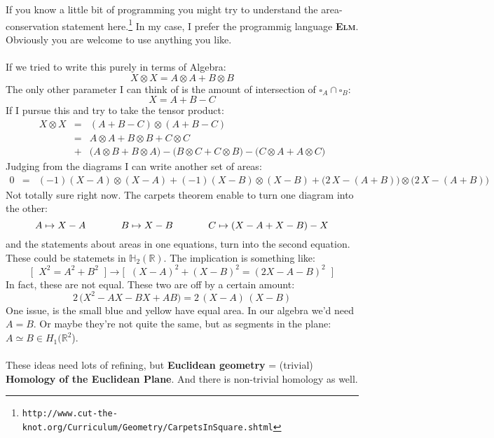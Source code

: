\documentclass[12pt]{article}
\begin{document}
If you know a little bit of programming you might try to understand the area-conservation statement here.\footnote{\texttt{http://www.cut-the-knot.org/Curriculum/Geometry/CarpetsInSquare.shtml}} In my case, I prefer the programmig language \textsc{\textbf{Elm}}.  Obviously you are welcome to use anything you like. \\ \\
If we tried to write this purely in terms of Algebra:
$$ X \otimes X = A \otimes A + B \otimes B  $$
The only other parameter I can think of is the amount of intersection of $\square_A \cap \square_B$:
$$  X = A + B - C $$
If I pursue this and try to take the tensor product:
\begin{eqnarray*} X \otimes X &=& (A + B - C) \otimes (A + B - C) \\  
&=& A \otimes A + B \otimes B + C \otimes C \\
&+& \big( A \otimes B + B \otimes A\big)
- \big( B \otimes C + C \otimes B\big)
- \big( C \otimes A + A \otimes C\big) \end{eqnarray*}
Judging from the diagrams I can write another set of areas:
\begin{eqnarray*}
0 &=& (-1)(X-A) \otimes (X-A) + (-1)(X-B) \otimes (X-B) +
\Big( 2\,X - (A+B) \Big)\otimes \Big(2\,X - (A+B)\Big) \end{eqnarray*}
Not totally sure right now.  The carpets theorem enable to turn one diagram into the other:
$$ A \mapsto X - A \hspace{0.5in} B \mapsto X-B 
\hspace{0.5in} C \mapsto (X-A+X-B)-X$$
and the statements about areas in one equations, turn into the second equation.  These could be statemets in $\mathbb{H}_2 (\mathbb{R})$.  The implication is something like:
$$ \bigg[ \;\; X^2 = A^2 + B^2 \;\; \bigg] \to \Bigg[\;\; (X-A)^2 + (X-B)^2 = (2X - A - B)^2 \;\; \Bigg] $$
In fact, these are not equal.  These two are off by a certain amount:
$$ 2 \,\big( X^2 - AX - BX + AB \big) = 2 \,(X-A)\,(X-B) $$
One issue, is the small blue and yellow have equal area.  In our algebra we'd need $A = B$.  Or maybe they're not quite the same, but as segments in the plane: $ A \simeq B \in H_1(\mathbb{R}^2$). \\ \\
These ideas need lots of refining, but \textbf{Euclidean geometry} = (trivial) \textbf{Homology of the Euclidean Plane}.  And there is non-trivial homology as well.

\vfill 
\end{document}
